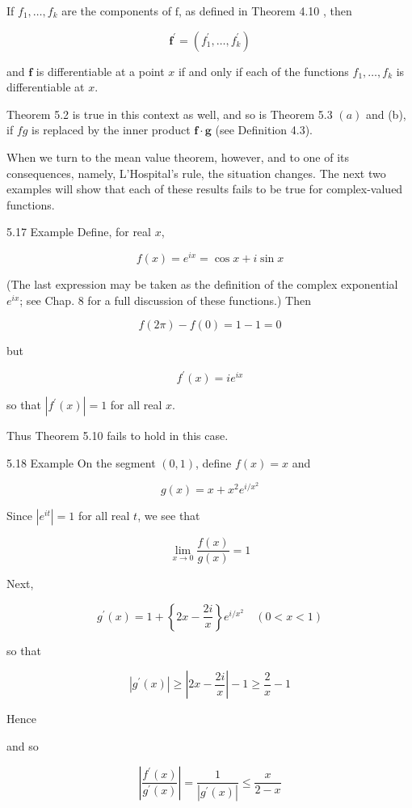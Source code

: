 \documentclass[10pt]{article}
\begin{document}
If $f_{1}, \ldots, f_{k}$ are the components of $\mathrm{f}$, as defined in Theorem 4.10 , then

$$
\mathbf{f}^{\prime}=\left(f_{1}^{\prime}, \ldots, f_{k}^{\prime}\right)
$$

and $\mathbf{f}$ is differentiable at a point $x$ if and only if each of the functions $f_{1}, \ldots, f_{k}$ is differentiable at $x$.

Theorem 5.2 is true in this context as well, and so is Theorem 5.3 $(a)$ and (b), if $f g$ is replaced by the inner product $\mathbf{f} \cdot \mathbf{g}$ (see Definition 4.3).

When we turn to the mean value theorem, however, and to one of its consequences, namely, L'Hospital's rule, the situation changes. The next two examples will show that each of these results fails to be true for complex-valued functions.

5.17 Example Define, for real $x$,

$$
f(x)=e^{i x}=\cos x+i \sin x
$$

(The last expression may be taken as the definition of the complex exponential $e^{i x}$; see Chap. 8 for a full discussion of these functions.) Then

$$
f(2 \pi)-f(0)=1-1=0
$$

but

$$
f^{\prime}(x)=i e^{i x}
$$

so that $\left|f^{\prime}(x)\right|=1$ for all real $x$.

Thus Theorem 5.10 fails to hold in this case.

5.18 Example On the segment $(0,1)$, define $f(x)=x$ and

$$
g(x)=x+x^{2} e^{i / x^{2}}
$$

Since $\left|e^{i t}\right|=1$ for all real $t$, we see that

$$
\lim _{x \rightarrow 0} \frac{f(x)}{g(x)}=1
$$

Next,

$$
g^{\prime}(x)=1+\left\{2 x-\frac{2 i}{x}\right\} e^{i / x^{2}} \quad(0<x<1)
$$

so that

$$
\left|g^{\prime}(x)\right| \geq\left|2 x-\frac{2 i}{x}\right|-1 \geq \frac{2}{x}-1
$$

Hence

and so

$$
\left|\frac{f^{\prime}(x)}{g^{\prime}(x)}\right|=\frac{1}{\left|g^{\prime}(x)\right|} \leq \frac{x}{2-x}
$$
\end{document}
